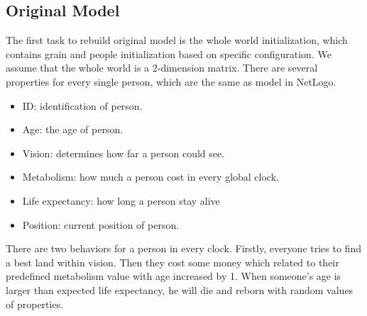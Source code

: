 \subsection{Original Model}
The first task to rebuild original model is the whole world initialization, which contains grain and people initialization based on specific configuration. We assume that the whole world is a 2-dimension matrix. There are several properties for every single person, which are the same as model in NetLogo.
   \begin{itemize}
   	\item ID: identification of person.
   	\item Age: the age of person.
	\item Vision: determines how far a person could see.
	\item Metabolism: how much a person cost in every global clock.
	\item Life expectancy: how long a person stay alive
	\item Position: current position of person.
\end{itemize}
There are two behaviors for a person in every clock. Firstly, everyone tries to find a best land within vision. Then they cost some money which related to their predefined metabolism value with age increased by 1. When someone's age is larger than expected life expectancy, he will die and reborn with random values of properties.
